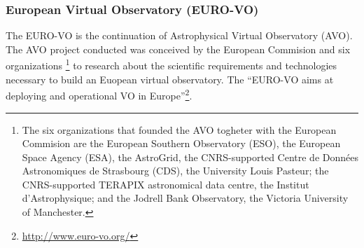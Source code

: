 \subsubsection{European Virtual Observatory (EURO-VO)}
The EURO-VO is the continuation of Astrophysical Virtual Observatory (AVO). The
AVO project conducted was conceived by the European Commision and six
organizations \footnote{The six organizations that founded the AVO togheter with
the European Commision are the European Southern Observatory (ESO), the European
Space Agency (ESA), the AstroGrid, the CNRS-supported Centre de Données
Astronomiques de Strasbourg (CDS), the University Louis Pasteur; the
CNRS-supported TERAPIX astronomical data centre, the Institut d'Astrophysique;
and the Jodrell Bank Observatory, the Victoria University of Manchester.} to
research about the scientific requirements and technologies necessary to build
an Euopean virtual observatory. The ``EURO-VO aims at deploying and operational
VO in Europe''\footnote{\url{http://www.euro-vo.org/}}.\\

